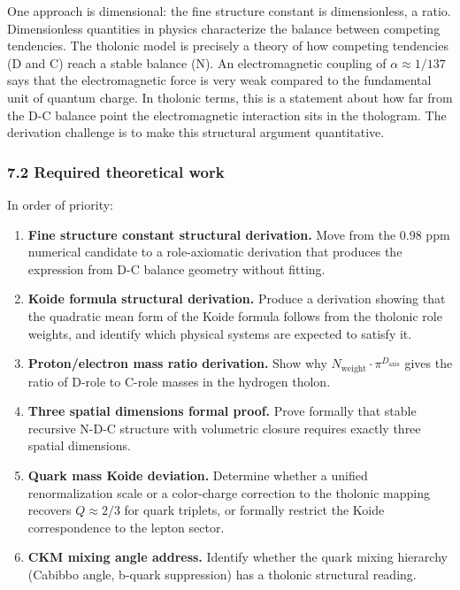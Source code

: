 \documentclass[
  11pt,
  letterpaper,
]{article}
\providecommand{\tightlist}{%
  \setlength{\itemsep}{0pt}\setlength{\parskip}{0pt}}
\begin{document}
One approach is dimensional: the fine structure constant is
dimensionless, a ratio. Dimensionless quantities in physics characterize
the balance between competing tendencies. The tholonic model is
precisely a theory of how competing tendencies (D and C) reach a stable
balance (N). An electromagnetic coupling of \(\alpha \approx 1/137\)
says that the electromagnetic force is very weak compared to the
fundamental unit of quantum charge. In tholonic terms, this is a
statement about how far from the D-C balance point the electromagnetic
interaction sits in the thologram. The derivation challenge is to make
this structural argument quantitative.

\subsubsection{7.2 Required theoretical
work}\label{required-theoretical-work}

In order of priority:

\begin{enumerate}
\def\labelenumi{\arabic{enumi}.}
\tightlist
\item
  \textbf{Fine structure constant structural derivation.} Move from the
  0.98 ppm numerical candidate to a role-axiomatic derivation that
  produces the expression from D-C balance geometry without fitting.
\item
  \textbf{Koide formula structural derivation.} Produce a derivation
  showing that the quadratic mean form of the Koide formula follows from
  the tholonic role weights, and identify which physical systems are
  expected to satisfy it.
\item
  \textbf{Proton/electron mass ratio derivation.} Show why
  \(N_{\text{weight}} \cdot \pi^{D_{\text{axis}}}\) gives the ratio of
  D-role to C-role masses in the hydrogen tholon.
\item
  \textbf{Three spatial dimensions formal proof.} Prove formally that
  stable recursive N-D-C structure with volumetric closure requires
  exactly three spatial dimensions.
\item
  \textbf{Quark mass Koide deviation.} Determine whether a unified
  renormalization scale or a color-charge correction to the tholonic
  mapping recovers \(Q \approx 2/3\) for quark triplets, or formally
  restrict the Koide correspondence to the lepton sector.
\item
  \textbf{CKM mixing angle address.} Identify whether the quark mixing
  hierarchy (Cabibbo angle, b-quark suppression) has a tholonic
  structural reading.
\end{enumerate}
\end{document}

